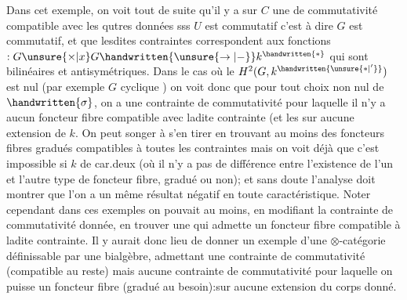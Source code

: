 
Dans cet exemple, on voit tout de suite qu'il y a sur $C$ une  de commutativité compatible avec les qutres données sss $U$ est commutatif c'est à dire $G$ est commutatif, et que lesdites contraintes correspondent  aux fonctions $: G\unsure{\times|x}G\handwritten{\unsure{\rightarrow|-}} k^{\handwritten{*}}$ qui sont bilinéaires et antisymétriques. Dans le cas où le $H^{2}(G,k^{\handwritten{\unsure{*|'}}})$ est  nul (par exemple $G$ cyclique ) on voit donc que pour tout choix non nul de $\handwritten{\sigma}$, on a une contrainte de commutativité pour laquelle il n'y a aucun foncteur fibre compatible avec ladite contrainte (et les  sur aucune extension de $k$. On peut songer à s'en tirer en trouvant au moins des foncteurs fibres gradués compatibles à toutes les contraintes mais on voit déjà que c'est impossible si $k$ de car.deux (où il n'y a pas de différence entre l'existence de l'un et l'autre type de foncteur fibre, gradué ou non); et sans doute l'analyse doit montrer que l'on a un même résultat négatif en toute caractéristique. Noter cependant dans ces exemples on pouvait au moins, en modifiant la contrainte de commutativité donnée, en trouver une qui admette un foncteur fibre compatible à ladite contrainte. Il y aurait donc lieu de donner un exemple d'une $\otimes$-catégorie définissable par une bialgèbre, admettant une contrainte de commutativité (compatible au reste) mais aucune contrainte de commutativité pour laquelle on puisse  un foncteur fibre (gradué au besoin):sur aucune extension du corps donné.


